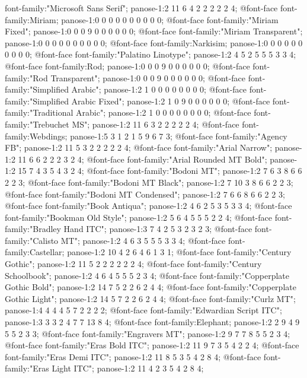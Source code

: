 	{font-family:"Microsoft Sans Serif";
	panose-1:2 11 6 4 2 2 2 2 2 4;}
@font-face
	{font-family:Miriam;
	panose-1:0 0 0 0 0 0 0 0 0 0;}
@font-face
	{font-family:"Miriam Fixed";
	panose-1:0 0 0 9 0 0 0 0 0 0;}
@font-face
	{font-family:"Miriam Transparent";
	panose-1:0 0 0 0 0 0 0 0 0 0;}
@font-face
	{font-family:Narkisim;
	panose-1:0 0 0 0 0 0 0 0 0 0;}
@font-face
	{font-family:"Palatino Linotype";
	panose-1:2 4 5 2 5 5 5 3 3 4;}
@font-face
	{font-family:Rod;
	panose-1:0 0 0 9 0 0 0 0 0 0;}
@font-face
	{font-family:"Rod Transparent";
	panose-1:0 0 0 9 0 0 0 0 0 0;}
@font-face
	{font-family:"Simplified Arabic";
	panose-1:2 1 0 0 0 0 0 0 0 0;}
@font-face
	{font-family:"Simplified Arabic Fixed";
	panose-1:2 1 0 9 0 0 0 0 0 0;}
@font-face
	{font-family:"Traditional Arabic";
	panose-1:2 1 0 0 0 0 0 0 0 0;}
@font-face
	{font-family:"Trebuchet MS";
	panose-1:2 11 6 3 2 2 2 2 2 4;}
@font-face
	{font-family:Webdings;
	panose-1:5 3 1 2 1 5 9 6 7 3;}
@font-face
	{font-family:"Agency FB";
	panose-1:2 11 5 3 2 2 2 2 2 4;}
@font-face
	{font-family:"Arial Narrow";
	panose-1:2 11 6 6 2 2 2 3 2 4;}
@font-face
	{font-family:"Arial Rounded MT Bold";
	panose-1:2 15 7 4 3 5 4 3 2 4;}
@font-face
	{font-family:"Bodoni MT";
	panose-1:2 7 6 3 8 6 6 2 2 3;}
@font-face
	{font-family:"Bodoni MT Black";
	panose-1:2 7 10 3 8 6 6 2 2 3;}
@font-face
	{font-family:"Bodoni MT Condensed";
	panose-1:2 7 6 6 8 6 6 2 2 3;}
@font-face
	{font-family:"Book Antiqua";
	panose-1:2 4 6 2 5 3 5 3 3 4;}
@font-face
	{font-family:"Bookman Old Style";
	panose-1:2 5 6 4 5 5 5 2 2 4;}
@font-face
	{font-family:"Bradley Hand ITC";
	panose-1:3 7 4 2 5 3 2 3 2 3;}
@font-face
	{font-family:"Calisto MT";
	panose-1:2 4 6 3 5 5 5 3 3 4;}
@font-face
	{font-family:Castellar;
	panose-1:2 10 4 2 6 4 6 1 3 1;}
@font-face
	{font-family:"Century Gothic";
	panose-1:2 11 5 2 2 2 2 2 2 4;}
@font-face
	{font-family:"Century Schoolbook";
	panose-1:2 4 6 4 5 5 5 2 3 4;}
@font-face
	{font-family:"Copperplate Gothic Bold";
	panose-1:2 14 7 5 2 2 6 2 4 4;}
@font-face
	{font-family:"Copperplate Gothic Light";
	panose-1:2 14 5 7 2 2 6 2 4 4;}
@font-face
	{font-family:"Curlz MT";
	panose-1:4 4 4 4 5 7 2 2 2 2;}
@font-face
	{font-family:"Edwardian Script ITC";
	panose-1:3 3 3 2 4 7 7 13 8 4;}
@font-face
	{font-family:Elephant;
	panose-1:2 2 9 4 9 5 5 2 3 3;}
@font-face
	{font-family:"Engravers MT";
	panose-1:2 9 7 7 8 5 5 2 3 4;}
@font-face
	{font-family:"Eras Bold ITC";
	panose-1:2 11 9 7 3 5 4 2 2 4;}
@font-face
	{font-family:"Eras Demi ITC";
	panose-1:2 11 8 5 3 5 4 2 8 4;}
@font-face
	{font-family:"Eras Light ITC";
	panose-1:2 11 4 2 3 5 4 2 8 4;}
